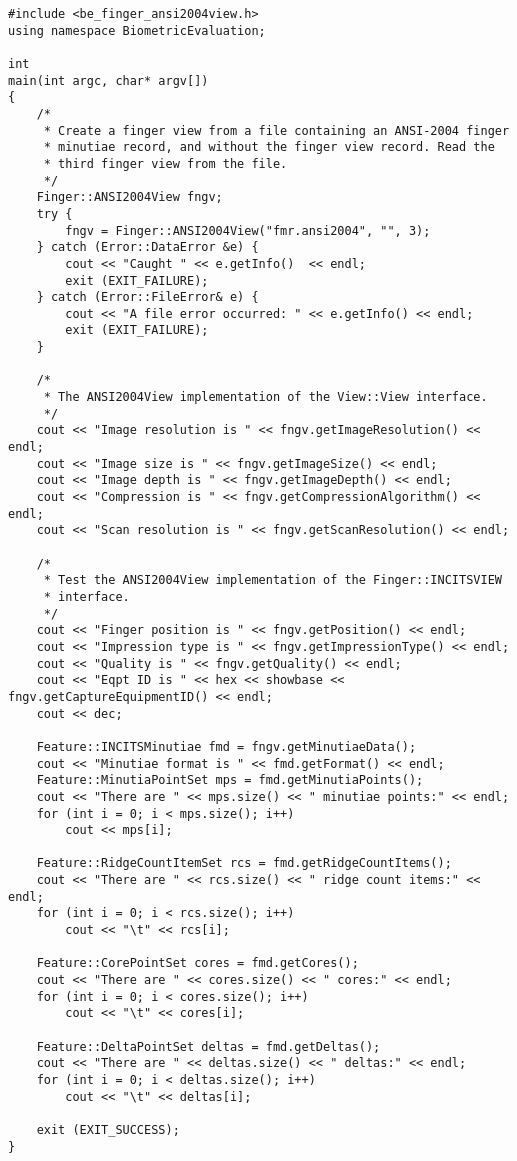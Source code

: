 \begin{lstlisting}[caption={INCITS Finger Views}, label=incitsfingerviewuse]
#include <be_finger_ansi2004view.h>
using namespace BiometricEvaluation;

int
main(int argc, char* argv[])
{
    /*
     * Create a finger view from a file containing an ANSI-2004 finger
     * minutiae record, and without the finger view record. Read the
     * third finger view from the file.
     */
    Finger::ANSI2004View fngv;
    try {
        fngv = Finger::ANSI2004View("fmr.ansi2004", "", 3);
    } catch (Error::DataError &e) {
        cout << "Caught " << e.getInfo()  << endl;
        exit (EXIT_FAILURE);
    } catch (Error::FileError& e) {
        cout << "A file error occurred: " << e.getInfo() << endl;
        exit (EXIT_FAILURE);
    }

    /*
     * The ANSI2004View implementation of the View::View interface.
     */
    cout << "Image resolution is " << fngv.getImageResolution() << endl;
    cout << "Image size is " << fngv.getImageSize() << endl;
    cout << "Image depth is " << fngv.getImageDepth() << endl;
    cout << "Compression is " << fngv.getCompressionAlgorithm() << endl;
    cout << "Scan resolution is " << fngv.getScanResolution() << endl;

    /*
     * Test the ANSI2004View implementation of the Finger::INCITSVIEW
     * interface.
     */
    cout << "Finger position is " << fngv.getPosition() << endl;
    cout << "Impression type is " << fngv.getImpressionType() << endl;
    cout << "Quality is " << fngv.getQuality() << endl;
    cout << "Eqpt ID is " << hex << showbase << fngv.getCaptureEquipmentID() << endl;
    cout << dec;

    Feature::INCITSMinutiae fmd = fngv.getMinutiaeData();
    cout << "Minutiae format is " << fmd.getFormat() << endl;
    Feature::MinutiaPointSet mps = fmd.getMinutiaPoints();
    cout << "There are " << mps.size() << " minutiae points:" << endl;
    for (int i = 0; i < mps.size(); i++)
        cout << mps[i];

    Feature::RidgeCountItemSet rcs = fmd.getRidgeCountItems();
    cout << "There are " << rcs.size() << " ridge count items:" << endl;
    for (int i = 0; i < rcs.size(); i++)
        cout << "\t" << rcs[i];

    Feature::CorePointSet cores = fmd.getCores();
    cout << "There are " << cores.size() << " cores:" << endl;
    for (int i = 0; i < cores.size(); i++)
        cout << "\t" << cores[i];

    Feature::DeltaPointSet deltas = fmd.getDeltas();
    cout << "There are " << deltas.size() << " deltas:" << endl;
    for (int i = 0; i < deltas.size(); i++)
        cout << "\t" << deltas[i];

    exit (EXIT_SUCCESS);
}
\end{lstlisting}
